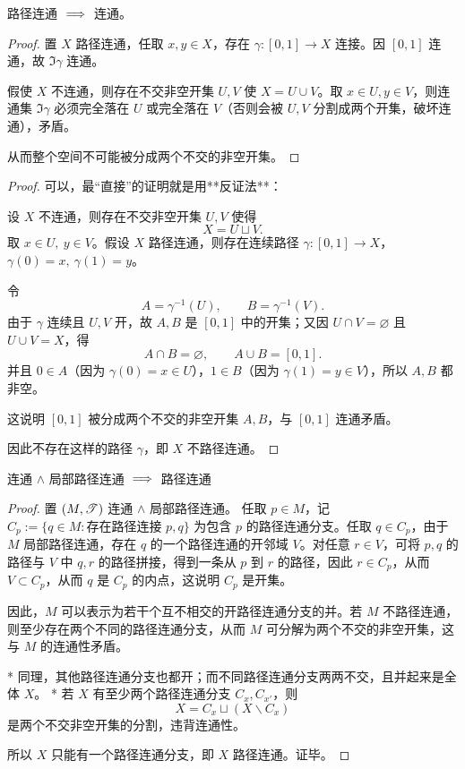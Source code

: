 \begin{theorem}
    路径连通 $\implies$ 连通。
\end{theorem}
\begin{proof}
    置 $X$ 路径连通，任取 $x,y\in X$，存在 $\gamma:[0,1]\to X$ 连接。因 $[0,1]$ 连通，故 $\Im\gamma$ 连通。

假使 $X$ 不连通，则存在不交非空开集 $U,V$ 使 $X=U\cup V$。取 $x\in U,y\in V$，则连通集 $\Im\gamma$ 必须完全落在 $U$ 或完全落在 $V$（否则会被 $U,V$ 分割成两个开集，破坏连通），矛盾。

    从而整个空间不可能被分成两个不交的非空开集。
\end{proof}

\begin{proof}
    可以，最“直接”的证明就是用**反证法**：

设 $X$ 不连通，则存在不交非空开集 $U,V$ 使得
\[
X=U\sqcup V.
\]
取 $x\in U,\ y\in V$。假设 $X$ 路径连通，则存在连续路径 $\gamma:[0,1]\to X$，$\gamma(0)=x,\ \gamma(1)=y$。

令
\[
A=\gamma^{-1}(U),\qquad B=\gamma^{-1}(V).
\]
由于 $\gamma$ 连续且 $U,V$ 开，故 $A,B$ 是 $[0,1]$ 中的开集；又因 $U\cap V=\varnothing$ 且 $U\cup V=X$，得
\[
A\cap B=\varnothing,\qquad A\cup B=[0,1].
\]
并且 $0\in A$（因为 $\gamma(0)=x\in U$），$1\in B$（因为 $\gamma(1)=y\in V$），所以 $A,B$ 都非空。

这说明 $[0,1]$ 被分成两个不交的非空开集 $A,B$，与 $[0,1]$ 连通矛盾。

因此不存在这样的路径 $\gamma$，即 $X$ 不路径连通。
\end{proof}


\begin{theorem}
    连通 $\land$ 局部路径连通 $\implies$ 路径连通
\end{theorem}
\begin{proof}
    置 $(M,\mathscr T)$ 连通 $\land$ 局部路径连通。
任取 $p\in M$，记 $C_p:=\{q\in M:\text{存在路径连接 $p,q$}\}$ 为包含 $p$ 的路径连通分支。任取 $q\in C_p$，由于 $M$ 局部路径连通，存在 $q$ 的一个路径连通的开邻域 $V$。对任意 $r\in V$，可将 $p,q$ 的路径与 $V$ 中 $q,r$ 的路径拼接，得到一条从 $p$ 到 $r$ 的路径，因此 $r\in C_p$，从而 $V\subset C_p$，从而 $q$ 是 $C_p$ 的内点，这说明 $C_p$ 是开集。

因此，$M$ 可以表示为若干个互不相交的开路径连通分支的并。若 $M$ 不路径连通，则至少存在两个不同的路径连通分支，从而 $M$ 可分解为两个不交的非空开集，这与 $M$ 的连通性矛盾。

* 同理，其他路径连通分支也都开；而不同路径连通分支两两不交，且并起来是全体 $X$。
* 若 $X$ 有至少两个路径连通分支 $C_x,C_{x'}$，则
  \[
  X=C_x\sqcup (X\backslash C_x)
  \]
  是两个不交非空开集的分割，违背连通性。

所以 $X$ 只能有一个路径连通分支，即 $X$ 路径连通。证毕。
\end{proof}

